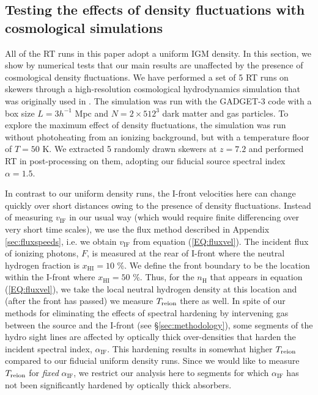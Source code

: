 \documentclass[twocolumn]{aastex62}
\newcommand{\Treion}{T_{\rm reion}}
\newcommand{\vIF}{v_{\mathrm{IF}}}
\newcommand{\spec}{\alpha_{\mathrm{IF}}}
\begin{document}
\begin{appendix}
{

\subsection{Testing the effects of density fluctuations with cosmological simulations}
\label{sec:density_flucs}

All of the RT runs in this paper adopt a uniform IGM density.  In this section, we show by numerical tests that our main results are unaffected by the presence of cosmological density fluctuations.  We have performed a set of 5 RT runs on skewers through a high-resolution cosmological hydrodynamics simulation that was originally used in \citet{2016MNRAS.457.3006D}.  The simulation was run with the GADGET-3 code \citep{2005MNRAS.364.1105S} with a box size $L=3 h^{-1}$ Mpc and $N=2\times 512^3$ dark matter and gas particles.  To explore the maximum effect of density fluctuations, the simulation was run without photoheating from an ionizing background, but with a temperature floor of $T=50$ K.  We extracted 5 randomly drawn skewers at $z=7.2$ and performed RT in post-processing on them, adopting our fiducial source spectral index $\alpha = 1.5$.  

In contrast to our uniform density runs, the I-front velocities here can change quickly over short distances owing to the presence of density fluctuations.  Instead of measuring $\vIF$ in our usual way (which would require finite differencing over very short time scales), we use the flux method described in Appendix \ref{sec:fluxspeeds}, i.e. we obtain $\vIF$ from equation (\ref{EQ:fluxvel}).  The incident flux of ionizing photons, $F$, is measured at the rear of I-front where the neutral hydrogen fraction is $x_{\mathrm{HI}}=10$ \%.  We define the front boundary to be the location within the I-front where $x_{\mathrm{HI}}=50$ \%.  Thus, for the $n_{\mathrm{H}}$ that appears in equation (\ref{EQ:fluxvel}), we take the local neutral hydrogen density at this location and (after the front has passed) we measure $\Treion$ there as well.   In spite of our methods for eliminating the effects of spectral hardening by intervening gas between the source and the I-front (see \S \ref{sec:methodology}), some segments of the hydro sight lines are affected by optically thick over-densities that harden the incident spectral index, $\spec$.  This hardening results in somewhat higher $\Treion$ compared to our fiducial uniform density runs.  Since we would like to measure $\Treion$ for {\it fixed} $\spec$, we restrict our analysis here to segments for which $\spec$ has not been significantly hardened by optically thick absorbers.    

}
\end{appendix}
\end{document}
